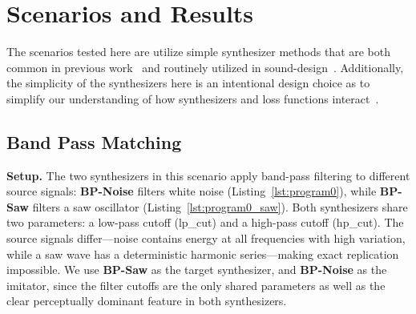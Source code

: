 \documentclass[10pt]{article} %
\newcommand{\BPNoise}{\textbf{BP-Noise}\xspace}
\newcommand{\BPSaw}{\textbf{BP-Saw}\xspace}
\begin{document}




\section{Scenarios and Results}
\label{sec:scenarios}
The scenarios tested here are utilize simple synthesizer methods that are both common in previous work~\cite{engel2020ddsp,vahidi2023mesostructures,lostanlen2019shape} and routinely utilized in sound-design~\cite{roads1996computer,lyons1997understanding}. Additionally, the simplicity of the synthesizers here is an intentional design choice as to simplify our understanding of how synthesizers and loss functions interact~\cite{salimi2025evaluating}.


\subsection{Band Pass Matching }
\label{sec:scenario_bp_saw_noise}

\textbf{Setup.} The two synthesizers in this scenario apply band-pass filtering to different source signals: \BPNoise filters white noise (Listing~\ref{lst:program0}), while \BPSaw filters a saw oscillator (Listing~\ref{lst:program0_saw}). Both synthesizers share two parameters: a low-pass cutoff (lp\_cut) and a high-pass cutoff (hp\_cut). The source signals differ---noise contains energy at all frequencies with high variation, while a saw wave has a deterministic harmonic series---making exact replication impossible. We use \BPSaw as the target synthesizer, and \BPNoise as the imitator, since the filter cutoffs are the only shared parameters as well as the clear perceptually dominant feature in both synthesizers. 
 
\end{document}
